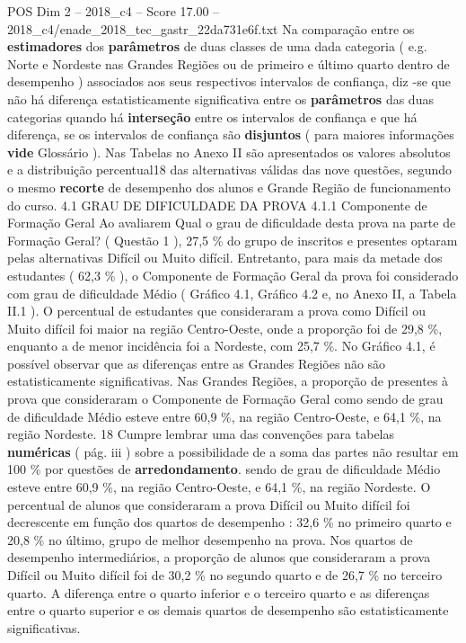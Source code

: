 \begin{textsample}{POS Dim 2 – 2018\_c4 – Score 17.00 – 2018\_c4/enade\_2018\_tec\_gastr\_22da731e6f.txt}
Na comparação entre os \textbf{estimadores} dos \textbf{parâmetros} de duas classes de uma dada categoria ( e.g.
Norte e Nordeste nas Grandes Regiões ou de primeiro e último quarto dentro de desempenho ) associados aos seus respectivos intervalos de confiança, diz -se que não há diferença estatisticamente significativa entre os \textbf{parâmetros} das duas categorias quando há \textbf{interseção} entre os intervalos de confiança e que há diferença, se os intervalos de confiança são \textbf{disjuntos} ( para maiores informações \textbf{vide} Glossário ).
Nas Tabelas no Anexo II são apresentados os valores absolutos e a distribuição percentual18 das alternativas válidas das nove questões, segundo o mesmo \textbf{recorte} de desempenho dos alunos e Grande Região de funcionamento do curso. 4.1 GRAU DE DIFICULDADE DA PROVA 4.1.1 Componente de Formação Geral Ao avaliarem Qual o grau de dificuldade desta prova na parte de Formação Geral? ( Questão 1 ), 27,5 \% do grupo de inscritos e presentes optaram pelas alternativas Difícil ou Muito difícil.
Entretanto, para mais da metade dos estudantes ( 62,3 \% ), o Componente de Formação Geral da prova foi considerado com grau de dificuldade Médio ( Gráfico 4.1, Gráfico 4.2 e, no Anexo II, a Tabela II.1 ).
O percentual de estudantes que consideraram a prova como Difícil ou Muito difícil foi maior na região Centro-Oeste, onde a proporção foi de 29,8 \%, enquanto a de menor incidência foi a Nordeste, com 25,7 \%.
No Gráfico 4.1, é possível observar que as diferenças entre as Grandes Regiões não são estatisticamente significativas.
Nas Grandes Regiões, a proporção de presentes à prova que consideraram o Componente de Formação Geral como sendo de grau de dificuldade Médio esteve entre 60,9 \%, na região Centro-Oeste, e 64,1 \%, na região Nordeste. 18 Cumpre lembrar uma das convenções para tabelas \textbf{numéricas} ( pág. iii ) sobre a possibilidade de a soma das partes não resultar em 100 \% por questões de \textbf{arredondamento}. sendo de grau de dificuldade Médio esteve entre 60,9 \%, na região Centro-Oeste, e 64,1 \%, na região Nordeste.
O percentual de alunos que consideraram a prova Difícil ou Muito difícil foi decrescente em função dos quartos de desempenho : 32,6 \% no primeiro quarto e 20,8 \% no último, grupo de melhor desempenho na prova.
Nos quartos de desempenho intermediários, a proporção de alunos que consideraram a prova Difícil ou Muito difícil foi de 30,2 \% no segundo quarto e de 26,7 \% no terceiro quarto.
A diferença entre o quarto inferior e o terceiro quarto e as diferenças entre o quarto superior e os demais quartos de desempenho são estatisticamente significativas.

\end{textsample}
